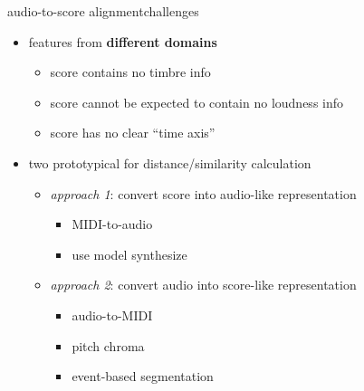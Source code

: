        \begin{frame}{audio-to-score alignment}{challenges}
            \begin{itemize}
                \item   features from \textbf{different domains} 
                    \begin{itemize}
                    \item   score contains no timbre info
                    \item   score cannot be expected to contain no loudness info
                    \item   score has no clear ``time axis''
                    \end{itemize}
                \bigskip
                \item<2->[$\Rightarrow$]   two prototypical for distance/similarity calculation
                    \begin{itemize}
                        \item   \textit{approach 1}: convert score into audio-like representation
                            \begin{itemize}
                                \item   MIDI-to-audio
                                \item   use model synthesize
                            \end{itemize}
                        \smallskip
                        \item   \textit{approach 2}: convert audio into score-like representation
                            \begin{itemize}
                                \item   audio-to-MIDI 
                                \item   pitch chroma
                                \item   event-based segmentation
                            \end{itemize}
                    \end{itemize}
            \end{itemize}
        \end{frame}
